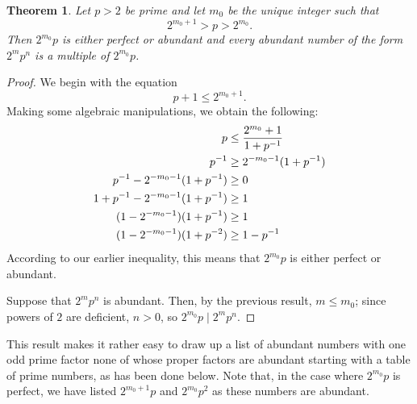 \documentclass[12pt]{article}
\newtheorem{thm}{Theorem}
\begin{document}
\begin{thm}
Let $p>2$ be prime and let $m_0$ be the unique integer such that
\[
2^{m_0 + 1} > p > 2^{m_0}.
\]
Then $2^{m_0} p$ is either perfect or abundant and every abundant
number of the form $2^m p^n$ is a multiple of $2^{m_0} p$.
\end{thm}

\begin{proof}
We begin with the equation
\[
p + 1 \le 2^{m_0 +1}.
\]
Making some algebraic manipulations, we obtain the following:
\begin{align*}
p &\le {2^{m_0} + 1 \over 1 + p^{-1}} \\
p^{-1} &\ge 2^{-m_0 - 1} (1 + p^{-1}) \\
p^{-1} - 2^{-m_0 - 1} (1 + p^{-1}) &\ge 0 \\
1 + p^{-1} - 2^{-m_0 - 1} (1 + p^{-1}) &\ge 1 \\
(1 - 2^{-m_0 - 1}) (1 + p^{-1}) &\ge 1 \\
(1 - 2^{-m_0 - 1}) (1 + p^{-2}) &\ge 1 - p^{-1}
\end{align*}
According to our earlier inequality, this means that
$2^{m_0} p$ is either perfect or abundant.  

Suppose that $2^m p^n$ is abundant.  Then, by the previous
result, $m \le m_0$; since powers of $2$ are deficient, $n > 0$,
so $2^{m_0} p \mid 2^m p^n$.
\end{proof}

This result makes it rather easy to draw up a list of abundant 
numbers with one odd prime factor none of whose proper factors 
are abundant starting with a table of prime numbers, as has
been done below.  Note that, in the case where $2^{m_0} p$ is
perfect, we have listed $2^{m_0 + 1} p$ and $2^{m_0} p^2$ as
these numbers are abundant.
\end{document}
